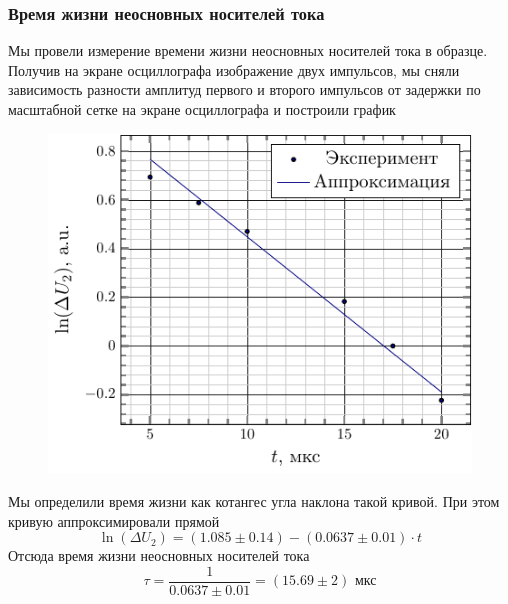 \documentclass[a4paper,14pt]{extarticle}
\begin{document}
\subsubsection{Время жизни неосновных носителей тока}
Мы провели измерение времени жизни неосновных носителей тока в образце. Получив на экране осциллографа изображение двух импульсов, мы сняли зависимость разности амплитуд первого и второго импульсов от задержки по масштабной сетке на экране осциллографа и построили график
\begin{figure}[h!]
	\centering
	\includegraphics[]{plot/lnu_t.pdf}
	\label{fig:figure100}
\end{figure}

Мы определили время жизни как котангес угла наклона такой кривой. При этом кривую аппроксимировали прямой
\begin{equation}
	\ln(\Delta U_2)=(1.085\pm0.14)-(0.0637\pm0.01)\cdot t
\end{equation}
Отсюда время жизни неосновных носителей тока
\begin{equation}
	\tau=\frac{1}{0.0637\pm0.01}=(15.69\pm 2)\text{ мкс}
\end{equation}



\end{document}
